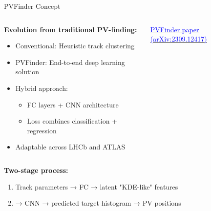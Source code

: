 \documentclass[10pt,aspectratio=169]{beamer}
\begin{document}
\begin{frame}{PVFinder Concept}
  \begin{columns}[T]
    \begin{column}{0.6\textwidth}
      \textbf{Evolution from traditional PV-finding:}
      \small
      \begin{itemize}
        \item Conventional: Heuristic track clustering
        \item PVFinder: End-to-end deep learning solution
        \item Hybrid approach:
          \begin{itemize}
            \item FC layers + CNN architecture
            \item Loss combines classification + regression
          \end{itemize}
        \item Adaptable across LHCb and ATLAS
      \end{itemize}
    \end{column}
    \begin{column}{0.4\textwidth}
      \begin{center}
        \href{https://arxiv.org/abs/2309.12417}{\textcolor{blue}{PVFinder paper (arXiv:2309.12417)}}
        \\
        \vspace{0.2cm}
      \end{center}
    \end{column}
  \end{columns}
  \vspace{-0.5cm}
  \small
  \textbf{Two-stage process:}
  \begin{enumerate}
    \item Track parameters → FC → latent "KDE-like" features
    \item → CNN → predicted target histogram → PV positions
  \end{enumerate}
\end{frame}
\end{document}
